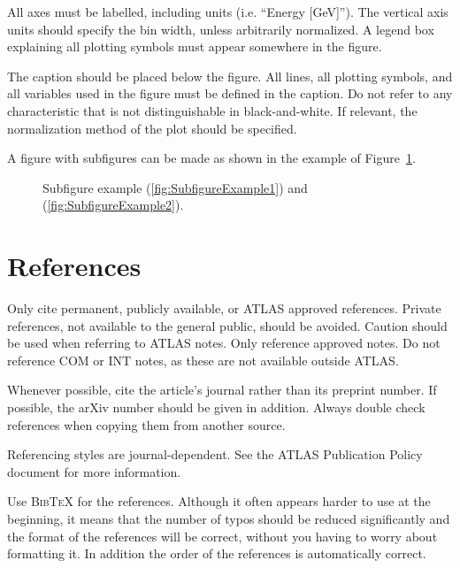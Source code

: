 \documentclass[UKenglish]{latex/atlasdoc}
\newcommand{\BibTeX}{\textsc{Bib\TeX}}
\begin{document}
All axes must be labelled, including units (i.e. ``Energy [\si{\GeV}]'').
The vertical axis units should specify the bin width, unless
arbitrarily normalized. A legend box explaining all plotting symbols
must appear somewhere in the figure.

The caption should be placed below the figure.  All lines, all
plotting symbols, and all variables used in the figure must be defined
in the caption. Do not refer to any characteristic that is not
distinguishable in black-and-white.  If relevant, the normalization
method of the plot should be specified.

A figure with subfigures can be made as shown in the example of
Figure~\ref{fig:subfigexample}.

\begin{figure}[htbp]
  \centering
  \caption{Subfigure example (\ref{fig:SubfigureExample1}) and
    (\ref{fig:SubfigureExample2}).}
  \label{fig:subfigexample}
\end{figure}


\section{References}
\label{sec:refs}

Only cite permanent, publicly available, or ATLAS approved references.
Private references, not available to the general public, should be
avoided. Caution should be used when referring to ATLAS notes.
Only reference approved notes. Do not reference COM or INT notes,
as these are not available outside ATLAS.

Whenever possible, cite the article's journal rather than its preprint number. 
If possible, the arXiv number should be given in addition.
Always double check references when copying them from another source.

Referencing styles are journal-dependent. See the ATLAS Publication
Policy document for more information.

Use \BibTeX{} for the references. Although it often
appears harder to use at the beginning, it means that the number of
typos should be reduced significantly and the format of the references
will be correct, without you having to worry about formatting it. In
addition the order of the references is automatically correct.
\end{document}
